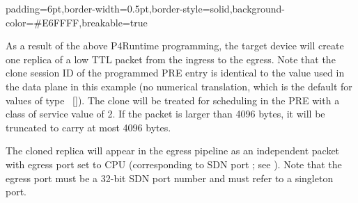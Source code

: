 \documentclass[11pt]{article}
\begin{document}
{%
\begin{mdbmargintb}{6pt}{6pt}%
\begin{mdblock}{padding=6pt,border-width=0.5pt,border-style=solid,background-color=\#E6FFFF,breakable=true}%
\begin{mdpre}%
\end{mdpre}%
\end{mdblock}%
\end{mdbmargintb}%

\noindent{}As a result of the above P4Runtime programming, the target device will create
one replica of a low TTL packet from the ingress to the egress. Note that the
clone session ID of the programmed PRE entry is identical to the value used in
the data plane in this example (no numerical translation, which is the default
for values of type ~[]). The clone will be
treated for scheduling in the PRE with a class of service value of 2. If the
packet is larger than 4096 bytes, it will be truncated to carry at most 4096
bytes.%

The cloned replica will appear in the egress pipeline as an independent packet
with egress port set to CPU (corresponding to SDN port ; see
). Note that the
egress port must be a 32-bit SDN port number and must refer to a singleton port.%

}
\end{document}
